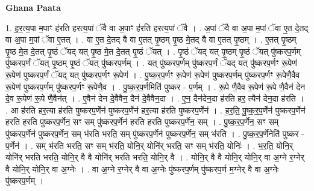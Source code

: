 \documentclass[17pt]{extarticle}
\begin{document}
\textbf{Ghana Paata } \newline

1. ह॒र॒त्य॒पा म॒पाꣳ ह॑रति हरत्य॒पां ॅवै वा अ॒पाꣳ ह॑रति हरत्य॒पां ॅवै । . अ॒पां ॅवै वा अ॒पा म॒पां ॅवा ए॒त दे॒तद् वा अ॒पा म॒पां ॅवा ए॒तत् । . वा ए॒त दे॒तद् वै वा ए॒तत् पृ॒ष्ठम् पृ॒ष्ठ मे॒तद् वै वा ए॒तत् पृ॒ष्ठम् । . ए॒तत् पृ॒ष्ठम् पृ॒ष्ठ मे॒त दे॒तत् पृ॒ष्ठं ॅयद् यत् पृ॒ष्ठ मे॒त दे॒तत् पृ॒ष्ठं ॅयत् । . पृ॒ष्ठं ॅयद् यत् पृ॒ष्ठम् पृ॒ष्ठं ॅयत् पु॑ष्करप॒र्णम् पु॑ष्करप॒र्णं ॅयत् पृ॒ष्ठम् पृ॒ष्ठं ॅयत् पु॑ष्करप॒र्णम् । . यत् पु॑ष्करप॒र्णम् पु॑ष्करप॒र्णं ॅयद् यत् पु॑ष्करप॒र्णꣳ रू॒पेण॑ रू॒पेण॑ पुष्करप॒र्णं ॅयद् यत् पु॑ष्करप॒र्णꣳ रू॒पेण॑ । . पु॒ष्क॒र॒प॒र्णꣳ रू॒पेण॑ रू॒पेण॑ पुष्करप॒र्णम् पु॑ष्करप॒र्णꣳ रू॒पेणै॒वैव रू॒पेण॑ पुष्करप॒र्णम् पु॑ष्करप॒र्णꣳ रू॒पेणै॒व । . पु॒ष्क॒र॒प॒र्णमिति॑ पुष्कर - प॒र्णम् । . रू॒पे णै॒वैव रू॒पेण॑ रू॒पे णै॒वैन॑ देन दे॒व रू॒पेण॑ रू॒पे णै॒वैन॑त् । . ए॒वैन॑ देन दे॒वैवैन॒ दैन॑ दे॒वैवैन॒दा । . ए॒न॒ दैन॑देन॒दा ह॑रति हर॒ त्यैन॑ देन॒दा ह॑रति । . आ ह॑रति हर॒त्या ह॑रति पुष्करप॒र्णेन॑ पुष्करप॒र्णेन॑ हर॒त्या ह॑रति पुष्करप॒र्णेन॑ । . ह॒र॒ति॒ पु॒ष्क॒र॒प॒र्णेन॑ पुष्करप॒र्णेन॑ हरति हरति पुष्करप॒र्णेन॒ सꣳ सम् पु॑ष्करप॒र्णेन॑ हरति हरति पुष्करप॒र्णेन॒ सम् । . पु॒ष्क॒र॒प॒र्णेन॒ सꣳ सम् पु॑ष्करप॒र्णेन॑ पुष्करप॒र्णेन॒ सम् भ॑रति भरति॒ सम् पु॑ष्करप॒र्णेन॑ पुष्करप॒र्णेन॒ सम् भ॑रति । . पु॒ष्क॒र॒प॒र्णेनेति॑ पुष्कर - प॒र्णेन॑ । . सम् भ॑रति भरति॒ सꣳ सम् भ॑रति॒ योनि॒र् योनि॑र् भरति॒ सꣳ सम् भ॑रति॒ योनिः॑ । . भ॒र॒ति॒ योनि॒र् योनि॑र् भरति भरति॒ योनि॒र् वै वै योनि॑र् भरति भरति॒ योनि॒र् वै । . योनि॒र् वै वै योनि॒र् योनि॒र् वा अ॒ग्ने र॒ग्नेर् वै योनि॒र् योनि॒र् वा अ॒ग्नेः । . वा अ॒ग्ने र॒ग्नेर् वै वा अ॒ग्नेः पु॑ष्करप॒र्णम् पु॑ष्करप॒र्ण म॒ग्नेर् वै वा अ॒ग्नेः पु॑ष्करप॒र्णम् । \newline
\end{document}
